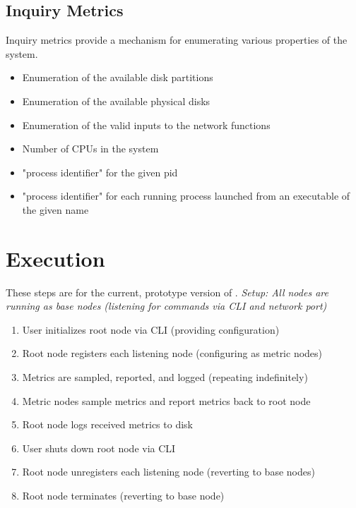 \subsection{Inquiry Metrics}
Inquiry metrics provide a mechanism for enumerating various properties of the system.
\begin{itemize}
\item Enumeration of the available disk partitions 
\item Enumeration of the available physical disks 
\item Enumeration of the valid inputs to the network functions 
\item Number of CPUs in the system 
\item "process identifier" for the given pid 
\item "process identifier" for each running process launched from an executable of the given name
\end{itemize}

\section{Execution}

These steps are for the current, prototype version of \dcamp. \textit{Setup: All nodes are running as base nodes
(listening for commands via CLI and network port)}

\begin{enumerate}

\item User initializes root node via CLI (providing configuration) 
\item Root node registers each listening node (configuring as metric nodes) 
\item Metrics are sampled, reported, and logged (repeating indefinitely) 
\item Metric nodes sample metrics and report metrics back to root node 
\item Root node logs received metrics to disk 
\item User shuts down root node via CLI 
\item Root node unregisters each listening node (reverting to base nodes) 
\item Root node terminates (reverting to base node)

\end{enumerate}


